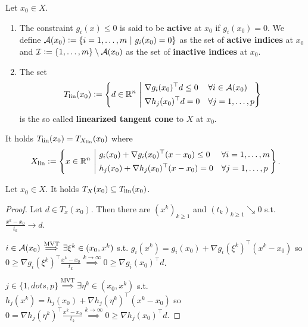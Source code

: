 \begin{definition}\label{def1.5}
    Let \(x_0 \in X\).
    \begin{enumerate}
        \item The constraint \(g_i(x) \le 0\) is said to be \textbf{active} at \(x_0\) if \(g_i(x_0) = 0\). We define \(\mathcal{A}(x_0) \mathrel{\mathop:}= \{i = 1,\dots,m \ | \ g_i(x_0) = 0\}\) as the set of \textbf{active indices} at \(x_0\) and \(\mathcal{I} \mathrel{\mathop:}= \{1,\dots,m\} \setminus \mathcal{A}(x_0)\) as the set of \textbf{inactive indices} at \(x_0\).
        \item The set \[T_{\operatorname{lin}}(x_0) \mathrel{\mathop:}= \left\{ d \in \mathbb{R}^n \ \middle| \ \begin{aligned} &\nabla g_i(x_0)^\top d \le 0 &&\forall i \in \mathcal{A}(x_0) \\ &\nabla h_j(x_0)^\top d = 0 &&\forall j = 1,\dots,p \end{aligned} \right\}\] is the so called \textbf{linearized tangent cone} to \(X\) at \(x_0\).
    \end{enumerate}
\end{definition}

\begin{remark}\label{rem1.6}
    It holds \(T_{\operatorname{lin}}(x_0) = T_{X_\mathrm{lin}}(x_0)\) where \[X_\mathrm{lin} \mathrel{\mathop:}= \left\{ x \in \mathbb{R}^n \ \middle| \ \begin{aligned} & g_i(x_0) + \nabla g_i(x_0)^\top (x - x_0) \le 0 && \forall i = 1,\dots,m \\ & h_j(x_0) + \nabla h_j(x_0)^\top (x - x_0) = 0 && \forall j = 1,\dots,p \end{aligned} \right\}.\]
\end{remark}

\begin{lemma}\label{lem1.7}
    Let \(x_0 \in X\). It holds \(T_X(x_0) \subseteq T_{\operatorname{lin}}(x_0)\).
\end{lemma}
\begin{proof}
    Let \(d \in T_x(x_0)\). Then there are \((x^k)_{k \ge 1}\) and \((t_k)_{k \ge 1} \searrow 0\) s.t. \(\frac{x^k - x_0}{t_k} \to d\).

    \(i \in \mathcal{A}(x_0) \stackrel{\mathrm{MVT}}{\implies} \exists \xi^k \in (x_0, x^k)\) s.t. \(g_i(x^k) = g_i(x_0) + \nabla g_i(\xi^k)^\top (x^k - x_0)\) so \(0 \ge \nabla g_i(\xi^k)^\top \frac{x^k - x_0}{t_k} \stackrel{k \to \infty}{\implies} 0 \ge \nabla g_i(x_0)^\top d\).

    \(j \in \{1,dots,p\} \stackrel{\mathrm{MVT}}{\implies} \exists \eta^k \in (x_0, x^k)\) s.t. \(h_j(x^k) = h_j(x_0) + \nabla h_j(\eta^k)^\top (x^k - x_0)\) so \(0 = \nabla h_j(\eta^k)^\top \frac{x^k - x_0}{t_k} \stackrel{k \to \infty}{\implies} 0 \ge \nabla h_j(x_0)^\top d\).
\end{proof}

